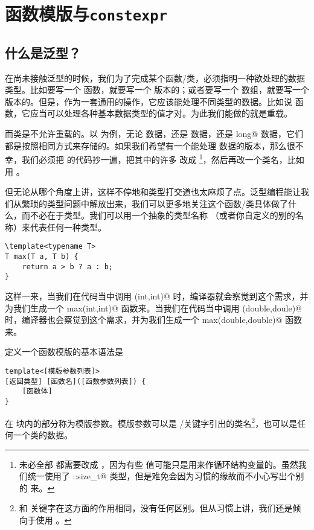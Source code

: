 \section{函数模版与\texttt{constexpr}}
\subsection*{什么是泛型？}
在尚未接触泛型的时候，我们为了完成某个函数/类，必须指明一种欲处理的数据类型。比如要写一个 \lstinline@max@ 函数，就要写一个 \lstinline@double@ 版本的；或者要写一个 \lstinline@valarray@ 数组，就要写一个 \lstinline@int@ 版本的。但是，作为一套通用的操作，它应该能处理不同类型的数据。比如说 \lstinline@max@ 函数，它应当可以处理各种基本数据类型的值才对。为此我们能做的就是重载。\par
而类是不允许重载的。以 \lstinline@valarray@ 为例，无论 \lstinline@int@ 数据，还是 \lstinline@double@ 数据，还是 \lstinline@long long@ 数据，它们都是按照相同方式来存储的。如果我们希望有一个能处理 \lstinline@double@ 数据的版本，那么很不幸，我们必须把 \lstinline@valarri@ 的代码抄一遍，把其中的许多 \lstinline@int@ 改成 \lstinline@double@\footnote{未必全部 \lstinline@int@ 都需要改成 \lstinline@double@，因为有些 \lstinline@int@ 值可能只是用来作循环结构变量的。虽然我们统一使用了 \lstinline@std::size_t@ 类型，但是难免会因为习惯的缘故而不小心写出个别的 \lstinline@int@ 来。}，然后再改一个类名，比如用 \lstinline@valarrd@。\par
但无论从哪个角度上讲，这样不停地和类型打交道也太麻烦了点。泛型编程能让我们从繁琐的类型问题中解放出来，我们可以更多地关注这个函数/类具体做了什么，而不必在于类型。我们可以用一个抽象的类型名称 \lstinline@T@（或者你自定义的别的名称）来代表任何一种类型。
\begin{lstlisting}
\template<typename T>
T max(T a, T b) {
    return a > b ? a : b;
}
\end{lstlisting}
这样一来，当我们在代码当中调用 \lstinline@max(int,int)@ 时，编译器就会察觉到这个需求，并为我们生成一个 \lstinline@int max(int,int)@ 函数来。当我们在代码当中调用 \lstinline@max(double,doule)@ 时，编译器也会察觉到这个需求，并为我们生成一个 \lstinline@double max(double,double)@ 函数来。\par
定义一个函数模版的基本语法是
\begin{lstlisting}
template<[模版参数列表]>
[返回类型] [函数名]([函数参数列表]) {
    [函数体]
}
\end{lstlisting}
在 \lstinline@template@ 块内的部分称为模版参数。模版参数可以是 \lstinline@typename@/\lstinline@class@ 关键字引出的类名\footnote{\lstinline@typename@ 和 \lstinline@class@ 关键字在这方面的作用相同，没有任何区别。但从习惯上讲，我们还是倾向于使用 \lstinline@typename@。}，也可以是任何一个类的数据。
